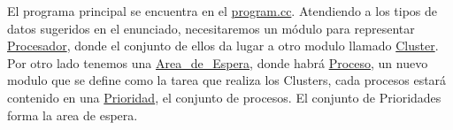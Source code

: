 El programa principal se encuentra en el \mbox{\hyperlink{program_8cc}{program.\+cc}}. Atendiendo a los tipos de datos sugeridos en el enunciado, necesitaremos un módulo para representar \mbox{\hyperlink{class_procesador}{Procesador}}, donde el conjunto de ellos da lugar a otro modulo llamado \mbox{\hyperlink{class_cluster}{Cluster}}. Por otro lado tenemos una \mbox{\hyperlink{class_area__de___espera}{Area\+\_\+de\+\_\+\+Espera}}, donde habrá \mbox{\hyperlink{class_proceso}{Proceso}}, un nuevo modulo que se define como la tarea que realiza los Clusters, cada procesos estará contenido en una \mbox{\hyperlink{class_prioridad}{Prioridad}}, el conjunto de procesos. El conjunto de Prioridades forma la area de espera. 